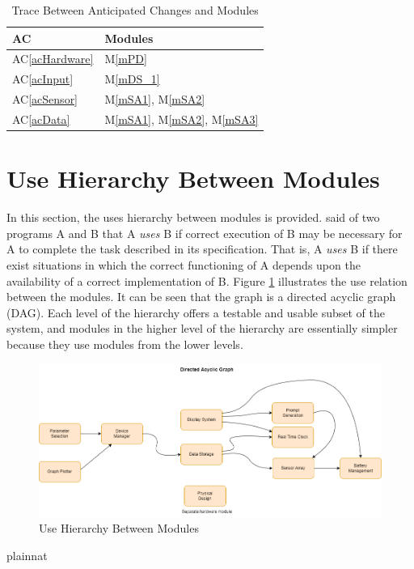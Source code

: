 \documentclass[12pt, titlepage]{article}
\newcommand{\acref}[1]{AC\ref{#1}}
\newcommand{\mref}[1]{M\ref{#1}}
\begin{document}
\begin{table}[H]
  \centering
  \begin{tabular}{p{} p{}}
    \toprule
    \textbf{AC}         & \textbf{Modules}  \\
    \midrule
    \acref{acHardware}  & \mref{mPD}        \\
    \acref{acInput}     & \mref{mDS_1}     \\
    \acref{acSensor}     & \mref{mSA1}, \mref{mSA2}     \\
    \acref{acData}     & \mref{mSA1}, \mref{mSA2}, \mref{mSA3}    \\
    \bottomrule
  \end{tabular}
  \caption{Trace Between Anticipated Changes and Modules}
  \label{TblACT}
\end{table}

\section{Use Hierarchy Between Modules} \label{SecUse}

In this section, the uses hierarchy between modules is
provided. \citet{Parnas1978} said of two programs A and B that A {\em uses} B if
correct execution of B may be necessary for A to complete the task described in
its specification. That is, A {\em uses} B if there exist situations in which
the correct functioning of A depends upon the availability of a correct
implementation of B.  Figure \ref{FigUH} illustrates the use relation between
the modules. It can be seen that the graph is a directed acyclic graph
(DAG). Each level of the hierarchy offers a testable and usable subset of the
system, and modules in the higher level of the hierarchy are essentially simpler
because they use modules from the lower levels.

\begin{figure}[H]
  \centering
\includegraphics[width=\textwidth]{DAG.png}
  \caption{Use Hierarchy Between Modules}
  \label{FigUH}
\end{figure}


 {plainnat}

\end{document}
